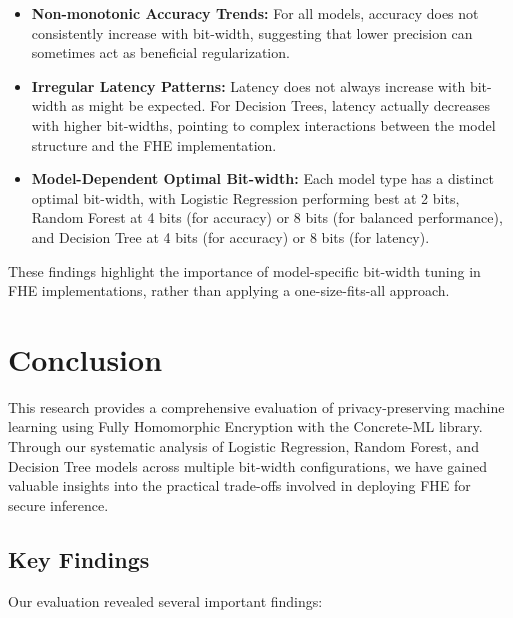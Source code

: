 \documentclass[a4paper,12pt]{article}
\begin{document}
\begin{itemize}
    \item \textbf{Non-monotonic Accuracy Trends:} For all models, accuracy does not consistently increase with bit-width, suggesting that lower precision can sometimes act as beneficial regularization.
    
    \item \textbf{Irregular Latency Patterns:} Latency does not always increase with bit-width as might be expected. For Decision Trees, latency actually decreases with higher bit-widths, pointing to complex interactions between the model structure and the FHE implementation.
    
    \item \textbf{Model-Dependent Optimal Bit-width:} Each model type has a distinct optimal bit-width, with Logistic Regression performing best at 2 bits, Random Forest at 4 bits (for accuracy) or 8 bits (for balanced performance), and Decision Tree at 4 bits (for accuracy) or 8 bits (for latency).
\end{itemize}

These findings highlight the importance of model-specific bit-width tuning in FHE implementations, rather than applying a one-size-fits-all approach.

\section{Conclusion}

This research provides a comprehensive evaluation of privacy-preserving machine learning using Fully Homomorphic Encryption with the Concrete-ML library. Through our systematic analysis of Logistic Regression, Random Forest, and Decision Tree models across multiple bit-width configurations, we have gained valuable insights into the practical trade-offs involved in deploying FHE for secure inference.

\subsection{Key Findings}

Our evaluation revealed several important findings:
\end{document}
